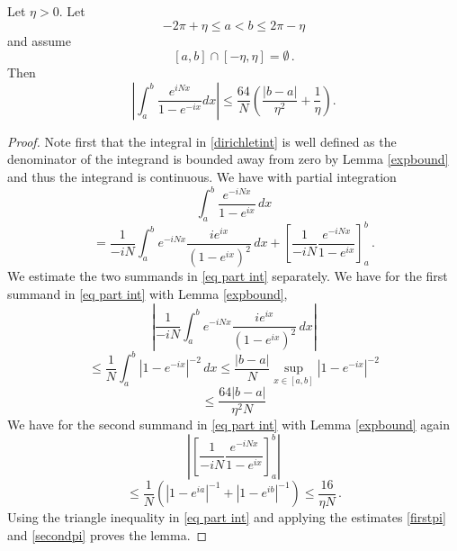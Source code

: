 {\begin{lemma}\label{lem diri}
Let $\eta>0$. Let
\begin{equation}
    -2\pi +\eta \le a<b \le 2\pi-\eta
\end{equation}
and assume
\begin{equation}\label{eq abdelta}
   [a,b]\cap [-\eta,\eta]=\emptyset \, .
\end{equation}
Then
    \begin{equation}\label{dirichletint}
    \left|\int_a^b
\frac {e^{iNx}} {1-e^{-ix}}
dx\right| \le \frac{64}N(\frac{|b-a|}{\eta^2}+\frac 1{\eta}).
\end{equation}
\end{lemma}
\begin{proof}
 Note first that the integral in \eqref{dirichletint}
    is well defined as the denominator of the integrand is bounded away from zero by Lemma \ref{expbound}
    and thus the integrand is continuous.
    We have with partial integration
\begin{equation*}
    \int_a^b
\frac {e^{-iNx}} {1-e^{ix}}\,
dx
\end{equation*}
\begin{equation}\label{eq part int}
=\frac 1{-iN}\int_a^b
{e^{-iNx}}\frac {ie^{ix}} {(1-e^{ix})^2}\, dx
+\left[ \frac 1{-iN}
\frac {e^{-iNx}} {1-e^{ix}}\right]_a^b\, .
\end{equation}
We estimate the two summands in
\eqref{eq part int} separately. We have
for the first summand in \eqref{eq part int}
with Lemma \ref{expbound},
\begin{equation*}
\left|   \frac 1 {-iN}\int_a^b
{e^{-iNx}}\frac{ie^{ix}}
{(1-e^{ix})^2}\,
dx \right|
\end{equation*}
\begin{equation}\label{firstpi}
    \le \frac 1N \int_a^b|1-e^{-ix}|^{-2} \, dx \le \frac {|b-a|}N\sup_{x\in [a,b]}|1-e^{-ix}|^{-2}
\end{equation}
\begin{equation}
    \le  \frac {64|b-a|}{\eta^2N}
\end{equation}
We have for the second summand in \eqref{eq part int}
with Lemma \ref{expbound} again
\begin{equation*}
   \left|\left[ \frac 1{-iN}
    \frac {e^{-iNx}} {1-e^{ix}}\right]_a^b\right|
\end{equation*}
\begin{equation}\label{secondpi}
   \le \frac 1N (|1-e^{ia}|^{-1}+|1-e^{ib}|^{-1})
    \le \frac {16}{\eta N}\, .
\end{equation}
Using the triangle inequality in \eqref{eq part int}
and applying the estimates \eqref{firstpi} and \eqref{secondpi}  proves the lemma.
\end{proof}



}
